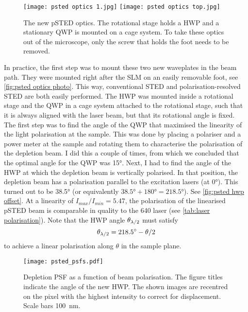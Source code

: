 \begin{figure}
	\centering
	\texttt{[image: psted optics 1.jpg]}%
	\hfill%
	\texttt{[image: psted optics top.jpg]}
	\caption{
		The new pSTED optics. The rotational stage holds a HWP and a stationary QWP is mounted on a cage system. To take these optics out of the microscope, only the screw that holds the foot needs to be removed.
	}
	\label{fig:psted optics photo}
\end{figure}

In practice, the first step was to mount these two new waveplates in the beam path. They were mounted right after the SLM on an easily removable foot, see \autoref{fig:psted optics photo}. This way, conventional STED and polarisation-resolved STED are both easily performed. The HWP was mounted inside a rotational stage and the QWP in a cage system attached to the rotational stage, such that it is always aligned with the laser beam, but that its rotational angle is fixed. The first step was to find the angle of the QWP that maximised the linearity of the light polarisation at the sample. This was done by placing a polariser and a power meter at the sample and rotating them to characterise the polarisation of the depletion beam. I did this a couple of times, from which we concluded that the optimal angle for the QWP was \ang{15}. Next, I had to find the angle of the HWP at which the depletion beam is vertically polarised. In that position, the depletion beam has a polarisation parallel to the excitation lasers (at \ang{0}). This turned out to be \ang{38.5} (or equivalently $\ang{38.5}+\ang{180}=\ang{218.5}$). See \autoref{fig:psted hwp offset}. At a linearity of $ I_{max}/I_{min} = 5.47 $, the polarisation of the linearised pSTED beam is comparable in quality to the 640 laser (see \autoref{tab:laser polarisation}). Note that the HWP angle $ \theta_{\lambda/2} $ must satisfy
\begin{equation}
	\theta_{\lambda/2} = \ang{218.5} - \theta/2
\end{equation} 
to achieve a linear polarisation along $ \theta $ in the sample plane.

\begin{figure}
	\centering
	\texttt{[image: psted\_psfs.pdf]}
	\caption{
		Depletion PSF as a function of beam polarisation. The figure titles indicate the angle of the new HWP. The shown images are recentred on the pixel with the highest intensity to correct for displacement. Scale bars 100~nm.
	}
	\label{fig:psted psfs}
\end{figure}

